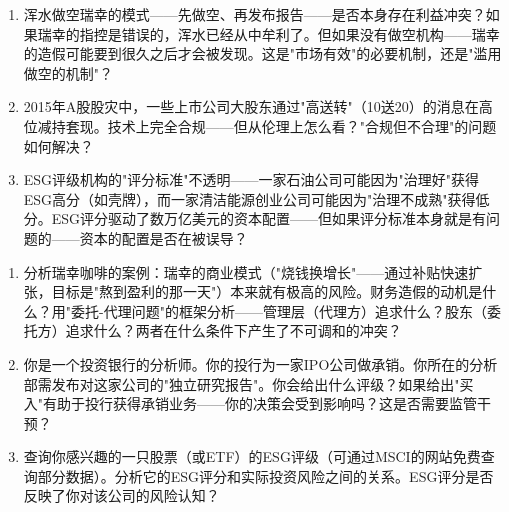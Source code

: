 \documentclass[a4paper,11pt]{ctexbook}
\begin{document}
\begin{discuss}
\begin{enumerate}
  \item 浑水做空瑞幸的模式——先做空、再发布报告——是否本身存在利益冲突？如果瑞幸的指控是错误的，浑水已经从中牟利了。但如果没有做空机构——瑞幸的造假可能要到很久之后才会被发现。这是"市场有效"的必要机制，还是"滥用做空的机制"？
  \item 2015年A股股灾中，一些上市公司大股东通过"高送转"（10送20）的消息在高位减持套现。技术上完全合规——但从伦理上怎么看？"合规但不合理"的问题如何解决？
  \item ESG评级机构的"评分标准"不透明——一家石油公司可能因为"治理好"获得ESG高分（如壳牌），而一家清洁能源创业公司可能因为"治理不成熟"获得低分。ESG评分驱动了数万亿美元的资本配置——但如果评分标准本身就是有问题的——资本的配置是否在被误导？
\end{enumerate}
\end{discuss}

\begin{exercises}
\begin{enumerate}
  \item 分析瑞幸咖啡的案例：瑞幸的商业模式（"烧钱换增长"——通过补贴快速扩张，目标是"熬到盈利的那一天"）本来就有极高的风险。财务造假的动机是什么？用"委托-代理问题"的框架分析——管理层（代理方）追求什么？股东（委托方）追求什么？两者在什么条件下产生了不可调和的冲突？
  \item 你是一个投资银行的分析师。你的投行为一家IPO公司做承销。你所在的分析部需发布对这家公司的"独立研究报告"。你会给出什么评级？如果给出"买入"有助于投行获得承销业务——你的决策会受到影响吗？这是否需要监管干预？
  \item 查询你感兴趣的一只股票（或ETF）的ESG评级（可通过MSCI的网站免费查询部分数据）。分析它的ESG评分和实际投资风险之间的关系。ESG评分是否反映了你对该公司的风险认知？
\end{enumerate}
\end{exercises}

\end{document}
